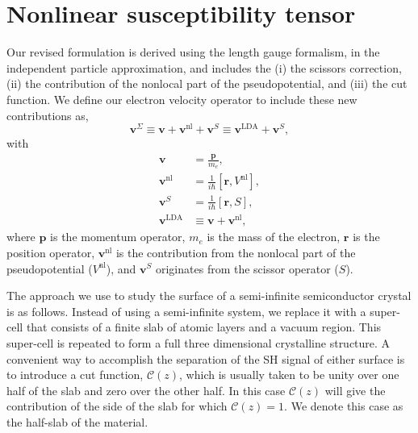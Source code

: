 \documentclass[prb,superscriptaddress,showpacs,twocolumn,letterpaper]{revtex4}
\begin{document}
\section{Nonlinear susceptibility tensor}\label{sec:tensor}

Our revised formulation is derived using the length gauge formalism, in the
independent particle approximation, and includes the (i) the scissors
correction, (ii) the contribution of the nonlocal part of the pseudopotential,
and (iii) the cut function.\cite{andersonPRB15} We define our electron velocity
operator to include these new contributions as,
\begin{equation*}\label{eq:vop2}
\mathbf{v}^\Sigma \equiv \mathbf{v} + \mathbf{v}^\mathrm{nl} + \mathbf{v}^S
                  \equiv \mathbf{v}^\mathrm{LDA} + \mathbf{v}^S,
\end{equation*}
with
\begin{align*}
\mathbf{v} &=\frac{\mathbf{p}}{m_e},\nonumber\\
\mathbf{v}^\mathrm{nl} 
&= \frac{1}{i\hbar}[\mathbf{r},V^\mathrm{nl}],\label{eq:vnl}\\
\mathbf{v}^S &= \frac{1}{i\hbar}[\mathbf{r}, S],\nonumber\\
\mathbf{v}^\mathrm{LDA} &\equiv \mathbf{v} + \mathbf{v}^\mathrm{nl},\nonumber
\end{align*}
where  $\mathbf{p}$ is the momentum operator, $m_e$ is the mass of the electron,
$\mathbf{r}$ is the position operator, $\mathbf{v}^\mathrm{nl}$ is the
contribution from the nonlocal part of the pseudopotential ($V^\mathrm{nl}$),
and $\mathbf{v}^S$ originates from the scissor operator ($S$).

The approach we use to study the surface of a semi-infinite semiconductor
crystal is as follows. Instead of using a semi-infinite system, we replace it
with a super-cell that consists of a finite slab of atomic layers and a vacuum
region. This super-cell is repeated to form a full three dimensional crystalline
structure. A convenient way to accomplish the separation of the SH signal of
either surface is to introduce a cut function, $\mathcal{C}(z)$, which is
usually taken to be unity over one half of the slab and zero over the other
half.\cite{mendozaPRL98} In this case $\mathcal{C}(z)$ will give the
contribution of the side of the slab for which $\mathcal{C}(z)=1$. We denote
this case as the half-slab of the material.
\end{document}
